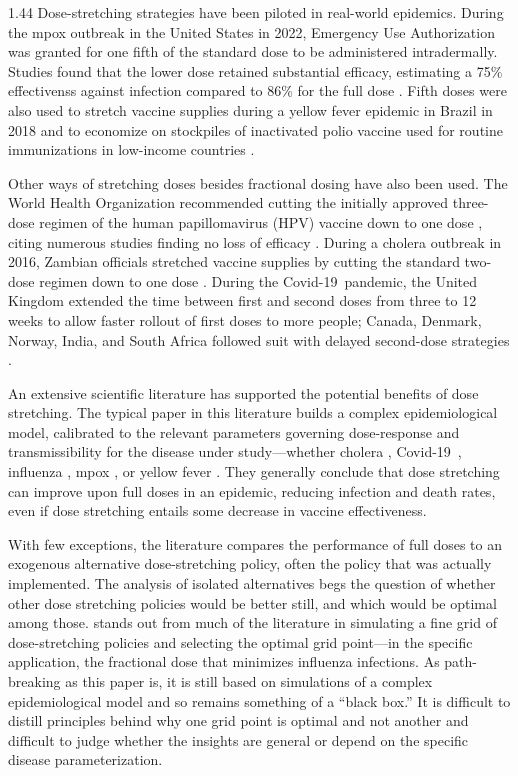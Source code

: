 \documentclass[12pt]{article}
\newcommand{\covid}{Covid-19}
\begin{document}
\begin{spacing}{1.44}
Dose-stretching strategies have been piloted in real-world
epidemics. During the mpox outbreak in the United States in 2022,
Emergency Use Authorization was granted for one fifth of the standard
dose to be administered intradermally. Studies found that the lower
dose retained substantial efficacy, estimating a 75\% effectivenss
against infection compared to 86\% for the full dose
\citep{Dalton2023}. Fifth doses were also used to stretch vaccine
supplies during a yellow fever epidemic in Brazil in 2018
\citep{PAHO2018} and to economize on stockpiles of inactivated polio
vaccine used for routine immunizations in low-income countries
\citep{Okayasu2017}.

Other ways of stretching doses besides fractional dosing have also
been used. The World Health Organization recommended cutting the
initially approved three-dose regimen of the human papillomavirus
(HPV) vaccine down to one dose \citep{WHO2022b}, citing numerous
studies finding no loss of efficacy \citep{WHO2022a}.  During a
cholera outbreak in 2016, Zambian officials stretched vaccine supplies
by cutting the standard two-dose regimen down to one dose
\citep{Leung2022}. During the \covid\ pandemic, the United Kingdom
extended the time between first and second doses from three to 12
weeks to allow faster rollout of first doses to more people; Canada,
Denmark, Norway, India, and South Africa followed suit with delayed
second-dose strategies \citep{Imai2023}.
  
An extensive scientific literature has supported the potential
benefits of dose stretching. The typical paper in this literature
builds a complex epidemiological model, calibrated to the relevant
parameters governing dose-response and transmissibility for the
disease under study---whether cholera \citep{Azman2015,Leung2022},
\covid\ \citep{Matrajt2021,Wiecek2022}, influenza \citep{Matrajt2015},
mpox \citep{Dimitrov2023}, or yellow fever \citep{Wu2016}. They
generally conclude that dose stretching can improve upon full doses in
an epidemic, reducing infection and death rates, even if dose
stretching entails some decrease in vaccine effectiveness.

With few exceptions, the literature compares the performance of full
doses to an exogenous alternative dose-stretching policy, often the
policy that was actually implemented. The analysis of isolated
alternatives begs the question of whether other dose stretching
policies would be better still, and which would be optimal among
those. \citet{Riley2007} stands out from much of the literature in
simulating a fine grid of dose-stretching policies and selecting the
optimal grid point---in the specific application, the fractional dose
that minimizes influenza infections. As path-breaking as this paper
is, it is still based on simulations of a complex epidemiological
model and so remains something of a ``black box.'' It is difficult to
distill principles behind why one grid point is optimal and not
another and difficult to judge whether the insights are general or
depend on the specific disease parameterization.


\end{spacing}
\end{document}
